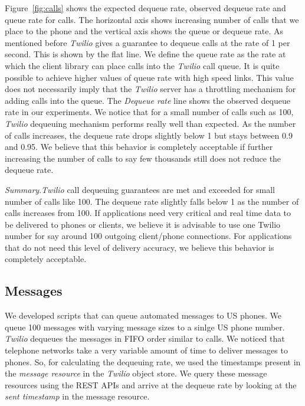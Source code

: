 Figure~\ref{fig:calls} shows the expected dequeue rate, observed dequeue rate and queue rate for calls. The horizontal axis shows increasing number of calls that we place to the phone and the vertical axis shows the queue or dequeue rate. As mentioned before \textit{Twilio} gives a guarantee to dequeue calls at the rate of 1 per second. This is shown by the flat line. We define the queue rate as the rate at which the client library can place calls into the \textit{Twilio} call queue. It is quite possible to achieve higher values of queue rate with high speed links. This value does not necessarily imply that the \textit{Twilio} server has a throttling mechanism for adding calls into the queue. The \textit{Dequeue rate} line shows the observed dequeue rate in our experiments. We notice that for a small number of calls such as 100, \textit{Twilio} dequeuing mechanism performs really well than expected. As the number of calls increases, the dequeue rate drops slightly below 1 but stays between 0.9 and 0.95. We believe that this behavior is completely acceptable if further increasing the number of calls to say few thousands still does not reduce the dequeue rate. 

\textit{Summary}.\textit{Twilio} call dequeuing guarantees are met and exceeded for small number of calls like 100. The dequeue rate slightly falls below 1 as the number of calls increases from 100. If applications need very critical and real time data to be delivered to phones or clients, we believe it is advisable to use one Twilio number for say around 100 outgoing client/phone connections. For applications that do not need this level of delivery accuracy, we believe this behavior is completely acceptable. 

\subsection{Messages}
\label{sec-measurements-sms}
We developed scripts that can queue automated messages to US phones. We queue 100 messages with varying message sizes to a sinlge US phone number. \textit{Twilio} dequeues the messages in FIFO order similar to calls. We noticed that telephone networks take a very variable amount of time to deliver messages to phones. So, for calculating the dequeuing rate, we used the timestamps present in the \textit{message resource} in the \textit{Twilio} object store. We query these message resources using the REST APIs and arrive at the dequeue rate by looking at the \textit{sent timestamp} in the message resource.   


